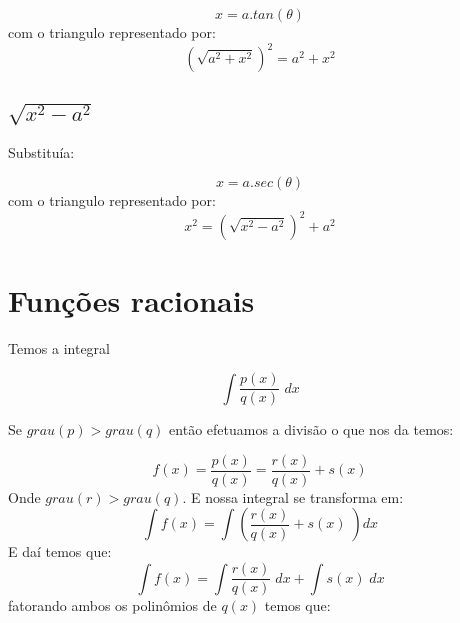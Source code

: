 \begin{equation}
    x = a.tan(\theta)
\end{equation}
com o triangulo representado por:
\begin{equation}
    (\sqrt{a^2 + x^2})^2 = a^2 + x^2
\end{equation}

\subsection{\(\sqrt{x^2 - a^2}\)}
Substituía:

\begin{equation}
    x = a.sec(\theta)
\end{equation}
com o triangulo representado por:
\begin{equation}
    x^2 = (\sqrt{x^2 - a^2})^2 + a^2 
\end{equation}


\section{Funções racionais}

Temos a integral 

\begin{equation}
    \int \frac{p(x)}{q(x)}\; dx
\end{equation}

Se \(grau(p) > grau(q)\) então efetuamos a divisão o que nos da temos:

\begin{equation}
    f(x) = \frac{p(x)}{q(x)} = \frac{r(x)}{q(x)} + s(x) 
\end{equation}
Onde \(grau(r) > grau(q)\). E nossa integral se transforma em:
\begin{equation}
    \int f(x) = \int \left( \frac{r(x)}{q(x)} + s(x)\; \right) dx
\end{equation}
E daí temos que:
\begin{equation}
    \int f(x) = \int \frac{r(x)}{q(x)}\; dx + \int s(x)\; dx 
\end{equation}
fatorando ambos os polinômios de \(q(x)\) temos que:


